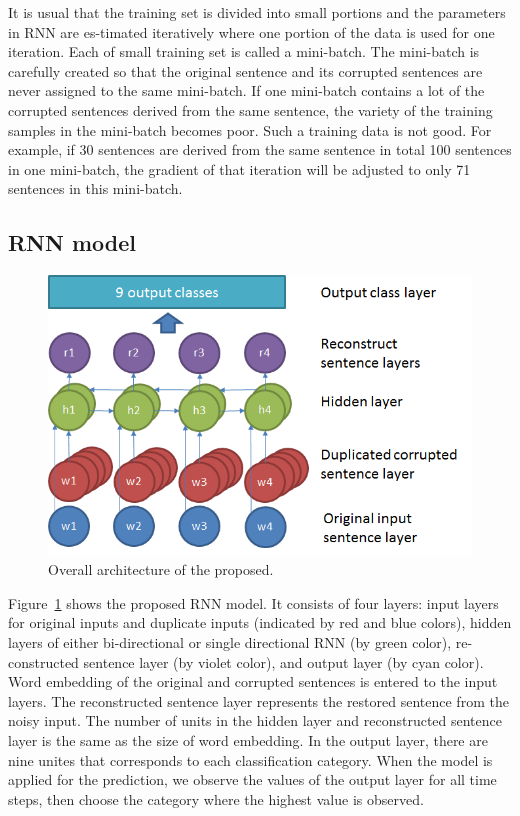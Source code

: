 It is usual that the training set is divided into small portions and the parameters
in RNN are es-timated iteratively where one portion of the data
is used for one iteration. 
Each of small training set is called a mini-batch. 
The mini-batch is carefully created so that the original sentence 
and its corrupted sentences are never assigned to the same mini-batch.
If one mini-batch contains a lot of the corrupted sentences derived 
from the same sentence, the variety of the training samples 
in the mini-batch becomes poor. 
Such a training data is not good. 
For example, if 30 sentences are derived from the same sentence in total 100 sentences
in one mini-batch, the gradient of that iteration will be adjusted 
to only 71 sentences in this mini-batch.
\subsection{RNN model}
\begin{figure}[!h]
\centering
  \includegraphics[scale=0.8]{image/overall_archi.png}
  \caption{Overall architecture of the proposed.}
  \label{fig:3}
\end{figure}
Figure~\ref{fig:3} shows the proposed RNN model. 
It consists of four layers: input layers for original inputs and duplicate inputs 
(indicated by red and blue colors), 
hidden layers of either bi-directional or single directional RNN (by green color),
re-constructed sentence layer (by violet color), 
and output layer (by cyan color). 
Word embedding of the original and corrupted sentences is
entered to the input layers. 
The reconstructed sentence layer represents the restored sentence 
from the noisy input. 
The number of units in the hidden layer and reconstructed sentence layer 
is the same as the size of word embedding. 
In the output layer, there are nine unites that corresponds to each 
classification category.
When the model is applied for the prediction, 
we observe the values of the output layer for all time steps,
then choose the category where the highest value is observed.


